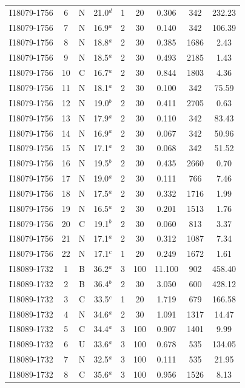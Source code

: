 \begin{table}
\begin{tabular}{ccccccccc}
I18079-1756 & 6 & N & 21.0$^{d}$ & 1 & 20 & 0.306 & 342 & 232.23 \\
I18079-1756 & 7 & N & 16.9$^{a}$ & 2 & 30 & 0.140 & 342 & 106.39 \\
I18079-1756 & 8 & N & 18.8$^{a}$ & 2 & 30 & 0.385 & 1686 & 2.43 \\
I18079-1756 & 9 & N & 18.5$^{a}$ & 2 & 30 & 0.493 & 2185 & 1.43 \\
I18079-1756 & 10 & C & 16.7$^{a}$ & 2 & 30 & 0.844 & 1803 & 4.36 \\
I18079-1756 & 11 & N & 18.1$^{a}$ & 2 & 30 & 0.100 & 342 & 75.59 \\
I18079-1756 & 12 & N & 19.0$^{b}$ & 2 & 30 & 0.411 & 2705 & 0.63 \\
I18079-1756 & 13 & N & 17.9$^{a}$ & 2 & 30 & 0.110 & 342 & 83.43 \\
I18079-1756 & 14 & N & 16.9$^{a}$ & 2 & 30 & 0.067 & 342 & 50.96 \\
I18079-1756 & 15 & N & 17.1$^{a}$ & 2 & 30 & 0.068 & 342 & 51.52 \\
I18079-1756 & 16 & N & 19.5$^{b}$ & 2 & 30 & 0.435 & 2660 & 0.70 \\
I18079-1756 & 17 & N & 19.0$^{a}$ & 2 & 30 & 0.111 & 766 & 7.46 \\
I18079-1756 & 18 & N & 17.5$^{a}$ & 2 & 30 & 0.332 & 1716 & 1.99 \\
I18079-1756 & 19 & N & 16.5$^{a}$ & 2 & 30 & 0.201 & 1513 & 1.76 \\
I18079-1756 & 20 & C & 19.1$^{b}$ & 2 & 30 & 0.060 & 813 & 3.37 \\
I18079-1756 & 21 & N & 17.1$^{a}$ & 2 & 30 & 0.312 & 1087 & 7.34 \\
I18079-1756 & 22 & N & 17.1$^{c}$ & 1 & 20 & 0.249 & 1672 & 1.61 \\
I18089-1732 & 1 & B & 36.2$^{a}$ & 3 & 100 & 11.100 & 902 & 458.40 \\
I18089-1732 & 2 & B & 36.4$^{b}$ & 2 & 30 & 3.050 & 600 & 428.12 \\
I18089-1732 & 3 & C & 33.5$^{c}$ & 1 & 20 & 1.719 & 679 & 166.58 \\
I18089-1732 & 4 & N & 34.6$^{a}$ & 2 & 30 & 1.091 & 1317 & 14.47 \\
I18089-1732 & 5 & C & 34.4$^{a}$ & 3 & 100 & 0.907 & 1401 & 9.99 \\
I18089-1732 & 6 & U & 33.6$^{a}$ & 3 & 100 & 0.678 & 535 & 134.05 \\
I18089-1732 & 7 & N & 32.5$^{a}$ & 3 & 100 & 0.111 & 535 & 21.95 \\
I18089-1732 & 8 & C & 35.6$^{a}$ & 3 & 100 & 0.956 & 1526 & 8.13 \\

\end{tabular}
\end{table}
